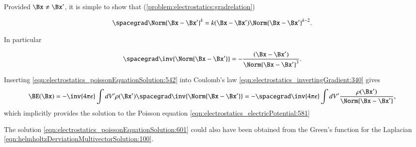 %
%
Provided \( \Bx \ne \Bx' \), it is simple to show that (\cref{problem:electrostatics:gradrelation})

\begin{dmath}\label{eqn:electrostatics_poissonEquationSolution:541}
\spacegrad \Norm{\Bx - \Bx'}^k = k (\Bx - \Bx') \Norm{ \Bx - \Bx' }^{k-2}.
\end{dmath}

In particular

\begin{dmath}\label{eqn:electrostatics_poissonEquationSolution:542}
\spacegrad \inv{\Norm{\Bx - \Bx'}} = - \frac{(\Bx - \Bx')}{\Norm{ \Bx - \Bx' }^{3}}.
\end{dmath}

Inserting \cref{eqn:electrostatics_poissonEquationSolution:542} into Coulomb's law \cref{eqn:electrostatics_invertingGradient:340} gives
\begin{dmath}\label{eqn:electrostatics_poissonEquationSolution:661}
\BE(\Bx)
=
-\inv{4 \pi \epsilon} \int dV' \rho(\Bx') \spacegrad \inv{\Norm{\Bx - \Bx'}}
=
- \spacegrad \inv{4 \pi \epsilon} \int dV' \frac{\rho(\Bx')}{\Norm{\Bx - \Bx'}},
\end{dmath}
which implicitly provides the solution to the Poisson equation \cref{eqn:electrostatics_electricPotential:581}

The solution \cref{eqn:electrostatics_poissonEquationSolution:601} could also have been obtained from the Green's function for the Laplacian
\cref{eqn:helmholtzDerviationMultivectorSolution:100}.
